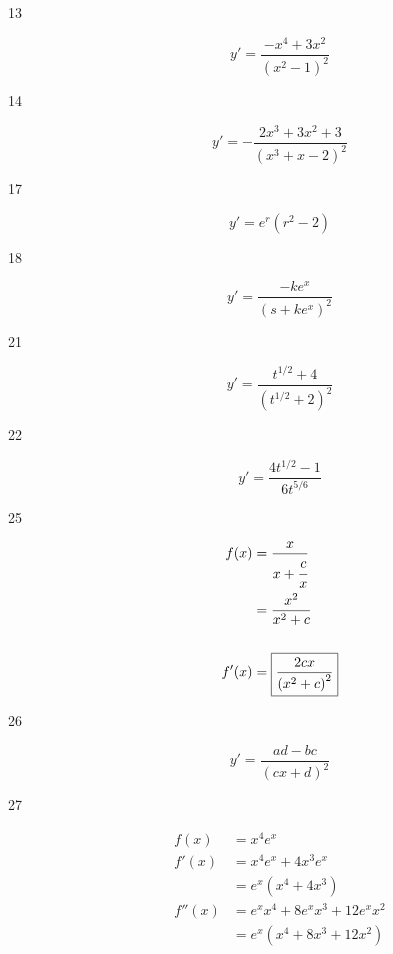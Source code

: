 \documentclass[letterpaper, landscape]{exam}
\begin{document}
\begin{description}
    \item[13] 
      \[
        y' = \boxed{ \frac{ -x^4 + 3x^2 }{\left( x^2 - 1 \right)^2} }
      \]
      
    \item[14] 
      \[
        y' = \boxed{ - \frac{2x^3 + 3x^2 + 3}{\left( x^3 + x - 2 \right)^2} }
      \]
      
      

    \item[17] 
      \[
        y' = \boxed{ e^r \left( r^2 - 2 \right) }
      \]

    \item[18] 
      \[
        y' = \boxed{ \frac{-k e^x}{\left( s + k e^x \right)^2} }
      \]

    \item[21] 
      \[
        y' = \boxed{ \frac{t^{1/2} + 4}{\left( t^{1/2} + 2 \right)^2} }
      \]

    \item[22] 
      \[
        y' = \boxed{ \frac{4 t^{1/2} - 1}{6t^{5/6}} }
      \]

    \item[25] 
      \begin{align*}
        f(x)  & = \frac{x}{x + \cfrac{c}{x} } \\
              & = \frac{x^2}{x^2 + c} \\
        \\
        f'(x) & = \boxed{ \frac{2 c x}{\left( x^2 + c \right)^2} }
      \end{align*}

    \item[26] 
      \[
        y' = \boxed{ \frac{a d - b c}{(c x + d)^2} }
      \]

    \item[27]
      \begin{align*}
        f(x)   & = x^4 e^x \\
        f'(x)  & = x^4 e^x + 4x^3 e^x \\
               & = \boxed{ e^x \left( x^4 + 4x^3 \right) } \\
        f''(x) & = e^x x^4 + 8 e^x x^3 + 12 e^x x^2 \\
               & = \boxed{ e^x \left( x^4 + 8 x^3 + 12 x^2  \right) } \\
      \end{align*}


\end{description}
\end{document}
